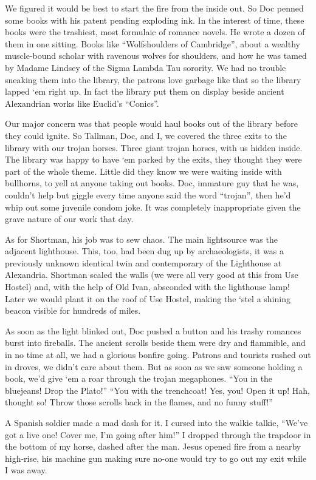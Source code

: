 \documentclass[oneside]{book}
\begin{document}
We figured it would be best to start the fire from the inside out.  So Doc penned some books with his
patent pending exploding ink.  In the interest of time, these books were the trashiest, most formulaic of
romance novels.  He wrote a dozen of them in one sitting.  Books like ``Wolfshoulders of Cambridge'',
about a wealthy muscle-bound scholar with ravenous wolves for shoulders, and how he was tamed by Madame
Lindsey of the Sigma Lambda Tau sorority.  We had no trouble sneaking them into the library, the patrons
love garbage like that so the library lapped `em right up.  In fact the library put them on display beside
ancient Alexandrian works like Euclid's ``Conics''.

Our major concern was that people would haul books out of the library before they could ignite.  So Tallman,
Doc, and I, we covered the three exits to the library with our trojan horses.  Three giant trojan horses,
with us hidden inside.  The library was happy to have `em parked by the exits, they thought they were part of
the whole theme.  Little did they know we were waiting inside with bullhorns, to yell at anyone taking out
books.  Doc, immature guy that he was, couldn't help but giggle every time anyone said the word ``trojan'',
then he'd whip out some juvenile condom joke.  It was completely inappropriate given the grave nature of our
work that day.

As for Shortman, his job was to sew chaos.  The main lightsource was the adjacent lighthouse.  This, too,
had been dug up by archaeologists, it was a previously unknown identical twin and contemporary of the Lighthouse
at Alexandria.  Shortman scaled the walls (we were all very good at this from Use Hostel) and, with the help of
Old Ivan, absconded with the lighthouse lamp!  Later we would plant it on the roof of Use Hostel, making
the `stel a shining beacon visible for hundreds of miles.

As soon as the light blinked out, Doc pushed a button and his trashy romances burst into fireballs.  The
ancient scrolls beside them were dry and flammible, and in no time at all, we had a glorious bonfire going.
Patrons and tourists rushed out in droves, we didn't care about them.  But as soon as we saw someone holding
a book, we'd give `em a roar through the trojan megaphones.  ``You in the bluejeans!  Drop the Plato!''
``You with the trenchcoat!  Yes, you!  Open it up!  Hah, thought so!  Throw those scrolls back in the flames,
and no funny stuff!''

A Spanish soldier made a mad dash for it.  I cursed into the walkie talkie, ``We've got a live one!  Cover me,
I'm going after him!''  I dropped through the trapdoor in the bottom of my horse, dashed after the man.
Jesus opened fire from a nearby high-rise, his machine gun making sure no-one would try to go out my exit while
I was away.
\end{document}
